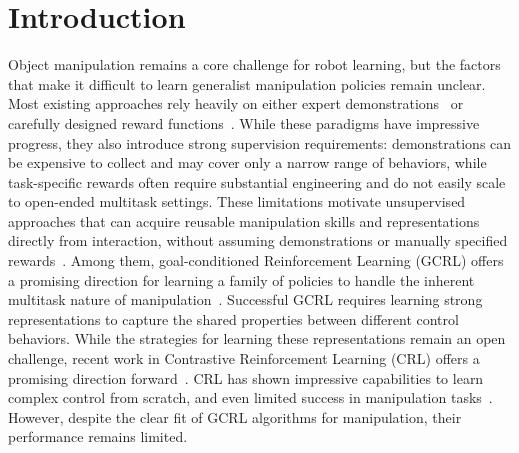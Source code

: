 \section{Introduction}
Object manipulation remains a core challenge for robot learning, but the factors that make it difficult to learn generalist manipulation policies remain unclear. Most existing approaches rely heavily on either expert demonstrations~\citep{vecerik2017leveraging, zitkovich2023rt, kim2024openvla, chi2025visuomotor, o2024open} or carefully designed reward functions~\citep{ma2024eureka, tang2025deep}. While these paradigms have impressive progress, they also introduce strong supervision requirements:  demonstrations can be expensive to collect and may cover only a narrow range of behaviors, while task-specific rewards often require substantial engineering and do not easily scale to open-ended multitask settings. These limitations motivate unsupervised approaches that can acquire reusable manipulation skills and representations directly from interaction, without assuming demonstrations or manually specified rewards~\citep{eysenbach2018diversity, touati2021learning, laskin2022unsupervised, park2024metra, agarwal2025unified}. Among them, goal-conditioned Reinforcement Learning (GCRL) offers a promising direction for learning a family of policies to handle the inherent multitask nature of manipulation~\citep{liu2022goal}. Successful GCRL requires learning strong representations to capture the shared properties between different control behaviors. While the strategies for learning these representations remain an open challenge, recent work in Contrastive Reinforcement Learning (CRL) offers a promising direction forward~\citep{eysenbach2022contrastive}. CRL has shown impressive capabilities to learn complex control from scratch, and even limited success in manipulation tasks~\citep{liu2025single}. However, despite the clear fit of GCRL algorithms for manipulation, their performance remains limited.


